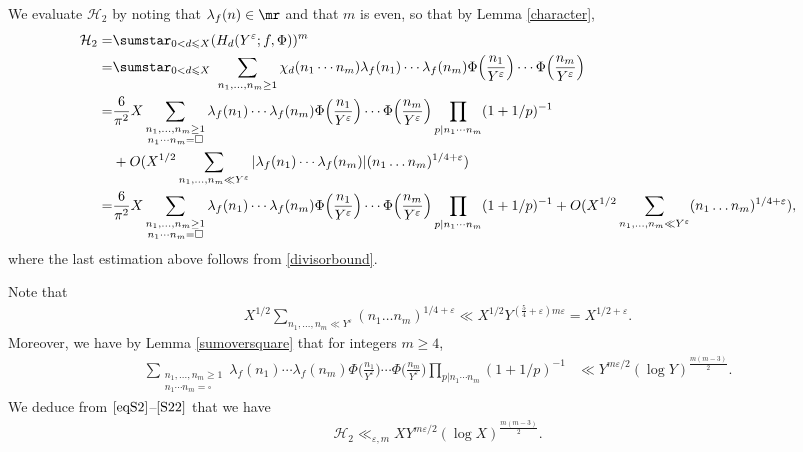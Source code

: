 \documentclass[twoside,leqno,10pt, A4]{amsart}
\begin{document}
 We evaluate $ \mathcal{H}_2$ by noting that $\lambda_f(n) \in \mr$ and that $m$ is even, so that by Lemma \ref{character},
  \begin{align}
\label{eqS2}
\begin{split}
 \mathcal{H}_2 = &\sumstar_{0<d\leqslant X}( H_{d}(Y^{\varepsilon};f,\Phi) )^m \\
=& \sumstar_{0<d\leqslant X} \,\,\sum_{n_1,\dots,n_m \geq 1} \chi_{d}(n_1\cdots n_m)\lambda_f(n_1)\cdots \lambda_f(n_m)\Phi\Big(\frac{n_1}{Y^{\varepsilon}}\Big)\cdots \Phi\Big(\frac{n_m}{Y^{\varepsilon}}\Big) \\
  = & \frac 6{\pi^2}X\sum_{\substack{n_1,\dots,n_m \geq 1\\ n_1\cdots n_m=\square}} \lambda_f(n_1)\cdots \lambda_f(n_m)\Phi\Big(\frac{n_1}{Y^{\varepsilon}}\Big)\cdots \Phi\Big(\frac{n_m}{Y^{\varepsilon}}\Big)\prod_{p|n_1\cdots n_m}(1+1/p)^{-1}\\
& +O(X^{1/2}\sum_{n_1,\dots,n_m \ll Y^{\varepsilon}}|\lambda_f(n_1)\cdots \lambda_f(n_m)|(n_1\dots n_m)^{1/4+\varepsilon}) \\
= & \frac 6{\pi^2}X\sum_{\substack{n_1,\dots,n_m \geq 1\\ n_1\cdots n_m=\square}} \lambda_f(n_1)\cdots \lambda_f(n_m)\Phi\Big(\frac{n_1}{Y^{\varepsilon}}\Big)\cdots \Phi\Big(\frac{n_m}{Y^{\varepsilon}}\Big)\prod_{p|n_1\cdots n_m}(1+1/p)^{-1}+O(X^{1/2}\sum_{n_1,\dots,n_m \ll Y^{\varepsilon}}(n_1\dots n_m)^{1/4+\varepsilon}),
\end{split}
\end{align}
where the last estimation above follows from \eqref{divisorbound}.

  Note that
\begin{align}\label{S21}
  X^{1/2} \sum_{n_1,\dots,n_m \ll Y^{\varepsilon}}(n_1\dots n_m)^{1/4+\varepsilon} \ll X^{1/2} Y^{(\frac{5}{4}+\varepsilon)m \varepsilon}=X^{1/2+\varepsilon}.
\end{align}
  Moreover, we have by Lemma \ref{sumoversquare} that for integers $m \geq 4$,
\begin{align}\label{S22}
 \sum_{\substack{n_1,\dots,n_m \geq 1\\ n_1\cdots n_m=\square}} \lambda_f(n_1)\cdots \lambda_f(n_m)\Phi\Big(\frac{n_1}{Y^{\varepsilon}}\Big)\cdots \Phi\Big(\frac{n_m}{Y^{\varepsilon}}\Big)\prod_{p|n_1\cdots n_m}(1+1/p)^{-1}
& \ll Y^{m\varepsilon/2}(\log Y)^{\frac{m(m-3)}{2}} .
\end{align}
  We deduce from $\eqref{eqS2}$--$\eqref{S22}$ that we have
\begin{align}
\label{H2bound}
\mathcal{H}_2 \ll_{\varepsilon, m} X Y^{m\varepsilon/2}(\log X)^{\frac{m(m-3)}{2}}.
\end{align}
\end{document}

